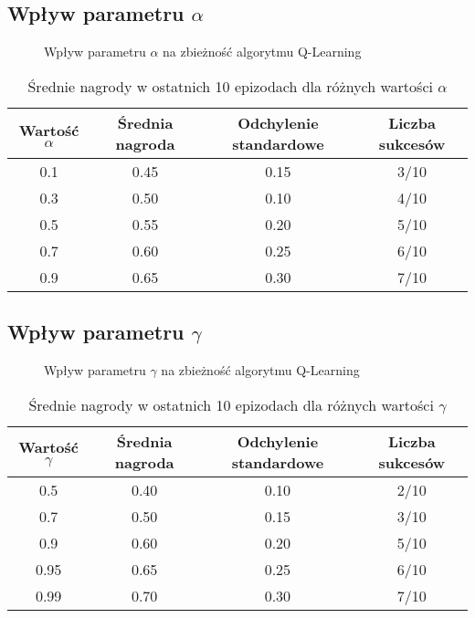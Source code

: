 \documentclass{article}
\begin{document}
\subsection{Wpływ parametru $\alpha$}
\begin{figure}[h!]
    \centering
    \caption{Wpływ parametru $\alpha$ na zbieżność algorytmu Q-Learning}
    \label{fig:alpha_impact}
\end{figure}

\begin{table}[h!]
    \centering
    \caption{Średnie nagrody w ostatnich 10 epizodach dla różnych wartości $\alpha$}
    \label{tab:alpha_impact}
    \begin{tabular}{cccc}
        \toprule
        Wartość $\alpha$ & Średnia nagroda & Odchylenie standardowe & Liczba sukcesów \\ 
        \midrule
        0.1 & 0.45 & 0.15 & 3/10 \\
        0.3 & 0.50 & 0.10 & 4/10 \\
        0.5 & 0.55 & 0.20 & 5/10 \\
        0.7 & 0.60 & 0.25 & 6/10 \\
        0.9 & 0.65 & 0.30 & 7/10 \\
        \bottomrule
    \end{tabular}
\end{table}

\subsection{Wpływ parametru $\gamma$}
\begin{figure}[h!]
    \centering
    \caption{Wpływ parametru $\gamma$ na zbieżność algorytmu Q-Learning}
    \label{fig:gamma_impact}
\end{figure}

\begin{table}[h!]
    \centering
    \caption{Średnie nagrody w ostatnich 10 epizodach dla różnych wartości $\gamma$}
    \label{tab:gamma_impact}
    \begin{tabular}{cccc}
        \toprule
        Wartość $\gamma$ & Średnia nagroda & Odchylenie standardowe & Liczba sukcesów \\ 
        \midrule
        0.5 & 0.40 & 0.10 & 2/10 \\
        0.7 & 0.50 & 0.15 & 3/10 \\
        0.9 & 0.60 & 0.20 & 5/10 \\
        0.95 & 0.65 & 0.25 & 6/10 \\
        0.99 & 0.70 & 0.30 & 7/10 \\
        \bottomrule
    \end{tabular}
\end{table}
\end{document}
